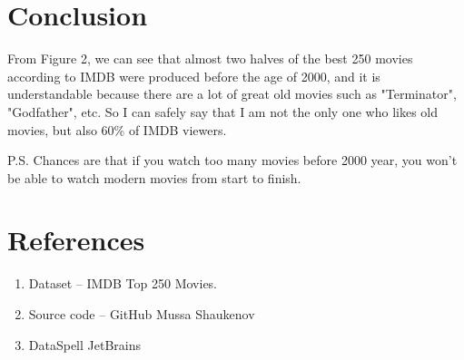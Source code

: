 \documentclass[10pt]{article}
\begin{document}
\begin{multicols}{2}
\section*{\centering \normalsize  Conclusion}
    \footnotesize{
        From Figure 2, we can see that almost two halves of the best 250 movies according to IMDB were produced before the age of 2000,
        and it is understandable because there are a lot of great old movies such as "Terminator", "Godfather", etc. 
        So I can safely say that I am not the only one who likes old movies, but also 60\% of IMDB viewers.
        \par P.S. Chances are that if you watch too many movies before 2000 year, you won't be able to watch modern movies from start to finish.

    }

\section*{\centering \normalsize  References}
    \footnotesize{
        \begin{enumerate}
                \item Dataset -- IMDB Top 250 Movies.
                \item Source code -- GitHub Mussa Shaukenov
                \item DataSpell JetBrains
        \end{enumerate}
    }



\end{multicols}
\end{document}

